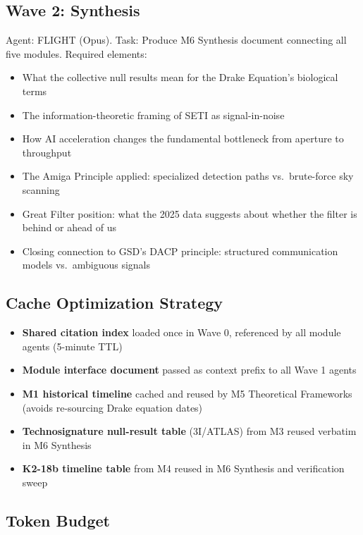 \documentclass[11pt,letterpaper]{article}
\begin{document}
\subsection{Wave 2: Synthesis}

Agent: FLIGHT (Opus). Task: Produce M6 Synthesis document connecting all five modules. Required elements:
\begin{itemize}[leftmargin=1.5em]
  \item What the collective null results mean for the Drake Equation's biological terms
  \item The information-theoretic framing of SETI as signal-in-noise
  \item How AI acceleration changes the fundamental bottleneck from aperture to throughput
  \item The Amiga Principle applied: specialized detection paths vs.\ brute-force sky scanning
  \item Great Filter position: what the 2025 data suggests about whether the filter is behind or ahead of us
  \item Closing connection to GSD's DACP principle: structured communication models vs.\ ambiguous signals
\end{itemize}

\subsection{Cache Optimization Strategy}

\begin{itemize}[leftmargin=1.5em]
  \item \textbf{Shared citation index} loaded once in Wave 0, referenced by all module agents (5-minute TTL)
  \item \textbf{Module interface document} passed as context prefix to all Wave 1 agents
  \item \textbf{M1 historical timeline} cached and reused by M5 Theoretical Frameworks (avoids re-sourcing Drake equation dates)
  \item \textbf{Technosignature null-result table} (3I/ATLAS) from M3 reused verbatim in M6 Synthesis
  \item \textbf{K2-18b timeline table} from M4 reused in M6 Synthesis and verification sweep
\end{itemize}

\subsection{Token Budget}
\end{document}
